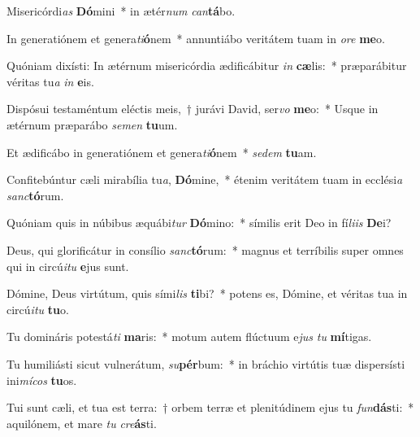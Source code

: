 \item Misericórdi\textit{as} \textbf{Dó}mini~* in ætér\textit{num} \textit{can}\textbf{tá}bo.

\item In generatiónem et genera\textit{ti}\textbf{ó}nem~* annuntiábo veritátem tuam in \textit{o}\textit{re} \textbf{me}o.

\item Quóniam dixísti: In ætérnum misericórdia ædificábitur \textit{in} \textbf{cæ}lis:~* præparábitur véritas tu\textit{a} \textit{in} \textbf{e}is.

\item Dispósui testaméntum eléctis meis,~† jurávi David, ser\textit{vo} \textbf{me}o:~* Usque in ætérnum præparábo \textit{se}\textit{men} \textbf{tu}um.

\item Et ædificábo in generatiónem et genera\textit{ti}\textbf{ó}nem~* \textit{se}\textit{dem} \textbf{tu}am.

\item Confitebúntur cæli mirabília tu\textit{a}, \textbf{Dó}mine,~* étenim veritátem tuam in ecclési\textit{a} \textit{sanc}\textbf{tó}rum.

\item Quóniam quis in núbibus æquábi\textit{tur} \textbf{Dó}mino:~* símilis erit Deo in fí\textit{li}\textit{is} \textbf{De}i?

\item Deus, qui glorificátur in consílio \textit{sanc}\textbf{tó}rum:~* magnus et terríbilis super omnes qui in circú\textit{i}\textit{tu} \textbf{e}jus sunt.

\item Dómine, Deus virtútum, quis sími\textit{lis} \textbf{ti}bi?~* potens es, Dómine, et véritas tua in circú\textit{i}\textit{tu} \textbf{tu}o.

\item Tu domináris potestá\textit{ti} \textbf{ma}ris:~* motum autem flúctuum e\textit{jus} \textit{tu} \textbf{mí}tigas.

\item Tu humiliásti sicut vulnerátum, \textit{su}\textbf{pér}bum:~* in bráchio virtútis tuæ dispersísti ini\textit{mí}\textit{cos} \textbf{tu}os.

\item Tui sunt cæli, et tua est terra:~† orbem terræ et plenitúdinem ejus tu \textit{fun}\textbf{dás}ti:~* aquilónem, et mare \textit{tu} \textit{cre}\textbf{ás}ti.

